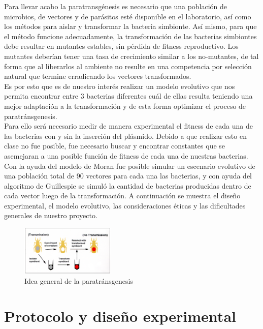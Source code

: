 \documentclass[12pt]{article}
\numberwithin{equation}{section}
\begin{document}
Para llevar acabo la paratransgénesis es necesario que una población de microbios, de vectores y de parásitos esté disponible en el laboratorio, así como los métodos para aislar y transformar la bacteria simbionte. Así mismo, para que el método funcione adecuadamente, la transformación de las bacterias simbiontes debe resultar en mutantes estables, sin pérdida de fitness reproductivo. Los mutantes deberían tener una tasa de crecimiento similar a los no-mutantes, de tal forma que al liberarlos al ambiente no resulte en una competencia por selección natural que termine erradicando los vectores transformados.\\
Es por esto que es de nuestro interés realizar un modelo evolutivo que nos permita encontrar entre 3 bacterias diferentes cuál de ellas resulta teniendo una mejor adaptación a la transformación y de esta forma optimizar el proceso de paratránsgenesis.\\

Para ello será necesario medir de manera experimental el fitness de cada una de las bacterias con y sin la inserción del plásmido. Debido a que realizar esto en clase no fue posible, fue necesario buscar y encontrar constantes que se asemejaran a una posible función de fitness de cada una de nuestras bacterias. Con la ayuda del modelo de Moran fue posible simular un escenario evolutivo de una población total de 90 vectores para cada una las bacterias, y con ayuda del algoritmo de Guillespie se simuló la cantidad de bacterias producidas dentro de cada vector luego de la transformación. A continuación se muestra el diseño experimental, el modelo evolutivo, las consideraciones éticas y las dificultades generales de nuestro proyecto.


\begin{figure}[!ht]
\begin {center}
\includegraphics[width=0.4\textwidth]{conversion.PNG}
\caption{Idea general de la paratránsgenesis}
\end {center}
\FloatBarrier
\end{figure}


\section{Protocolo y diseño experimental}
\end{document}
